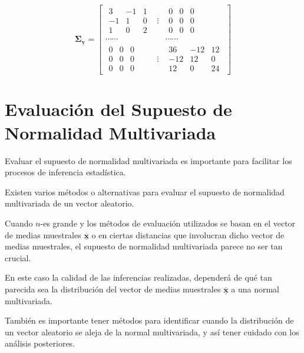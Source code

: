 \documentclass[
]{book}
\theoremstyle{definition}
\theoremstyle{definition}
\theoremstyle{definition}
\theoremstyle{definition}
\theoremstyle{remark}
\begin{document}
\[
\mathbf{\Sigma}_{\underline{\mathbf{v}}}=\begin{bmatrix}
\begin{matrix}
3 & -1 & 1\\ -1 & 1 &0 \\ 1 & 0& 2
\end{matrix} & \vdots &  \begin{matrix}
0 & 0 & 0\\ 0 & 0 &0 \\ 0 & 0& 0
\end{matrix} \\
\cdots\cdots & & \cdots\cdots \\
\begin{matrix}
0 & 0 & 0\\ 0 & 0 &0 \\ 0 & 0& 0
\end{matrix} & \vdots & \begin{matrix}
36 & -12 & 12\\ -12 & 12 &0 \\ 12 & 0& 24
\end{matrix}
\end{bmatrix}
\]

\hypertarget{evaluaciuxf3n-del-supuesto-de-normalidad-multivariada}{%
\section{Evaluación del Supuesto de Normalidad Multivariada}\label{evaluaciuxf3n-del-supuesto-de-normalidad-multivariada}}

Evaluar el supuesto de normalidad multivariada es importante para facilitar los procesos de inferencia estadística.

Existen varios métodos o alternativas para evaluar el supuesto de normalidad multivariada de un vector aleatorio.

Cuando \(n\)-es grande y los métodos de evaluación utilizados se basan en el vector de medias muestrales \(\overline{\underline{\mathbf{x}}}\) o en ciertas distancias que involucran dicho vector de medias muestrales, el supuesto de normalidad multivariada parece no ser tan crucial.

En este caso la calidad de las inferencias realizadas, dependerá de qué tan parecida sea la distribución del vector de medias muestrales \(\overline{\underline{\mathbf{x}}}\) a una normal multivariada.

También es importante tener métodos para identificar cuando la distribución de un vector aleatorio se aleja de la normal multivariada, y así tener cuidado con los análisis posteriores.
\end{document}
